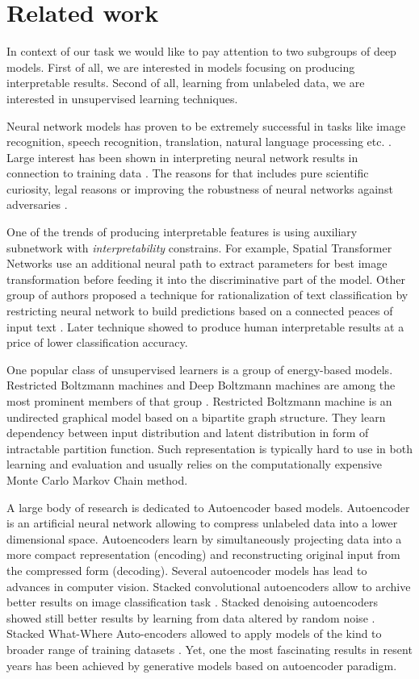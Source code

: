 
\chapter{Related work}

In context of our task we would like to pay attention to two subgroups of deep models.
First of all, we are interested in models focusing on producing interpretable results.
Second of all, learning from unlabeled data, we are interested in unsupervised learning techniques.

Neural network models has proven to be extremely successful in tasks like image recognition, speech recognition, translation, natural language processing etc. \cite{}.
Large interest has been shown in interpreting neural network results in connection to training data \cite{Yosinski2015, Mahendran2014, Lei2016}.
The reasons for that includes pure scientific curiosity, legal reasons or improving the robustness of neural networks against adversaries \cite{Goodfellow2015}.

One of the trends of producing interpretable features is using auxiliary subnetwork with \textit{interpretability} constrains.
For example, Spatial Transformer Networks \cite{Jaderberg2015} use an additional neural path to extract parameters for best image transformation before feeding it into the discriminative part of the model.
Other group of authors proposed a technique for rationalization of text classification by restricting neural network to build predictions based on a connected peaces of input text \cite{Lei2016}.
Later technique showed to produce human interpretable results at a price of lower classification accuracy.

One popular class of unsupervised learners is a group of energy-based models.
Restricted Boltzmann machines and Deep Boltzmann machines are among the most prominent members of that group \cite{Ackley1985, Salakhutdinov2009}.
Restricted Boltzmann machine is an undirected graphical model based on a bipartite graph structure.
They learn dependency between input distribution and latent distribution in form of intractable partition function.
Such representation is typically hard to use in both learning and evaluation and usually relies on the computationally expensive Monte Carlo Markov Chain method.

A large body of research is dedicated to Autoencoder based models.
Autoencoder is an artificial neural network allowing to compress unlabeled data into a lower dimensional space.
Autoencoders learn by simultaneously projecting data into a more compact representation (encoding) and reconstructing original input from the compressed form (decoding).
Several autoencoder models has lead to advances in computer vision.
Stacked convolutional autoencoders allow to archive better results on image classification task \cite{Masci2011}.
Stacked denoising autoencoders showed still better results by learning from data altered by random noise  \cite{Vincent2010}.
Stacked What-Where Auto-encoders allowed to apply models of the kind to broader range of training datasets \cite{Zhao2015}.
Yet, one the most fascinating results in resent years has been achieved by generative models based on autoencoder paradigm.

